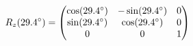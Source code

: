 \documentclass[preview]{standalone}
\begin{document}
\begin{align*}
\special{dvisvgm:raw <g id='unique000'>}R_z(29.4^\circ) = \begin{pmatrix} \cos(29.4^\circ) & -\sin(29.4^\circ) & 0 \\ \sin(29.4^\circ) & \cos(29.4^\circ) & 0 \\ 0 & 0 & 1 \end{pmatrix}\special{dvisvgm:raw </g>}
\end{align*}
\end{document}
